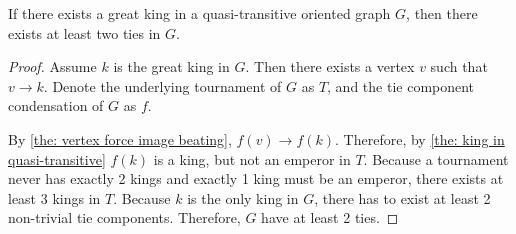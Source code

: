 \begin{corollary}
  If there exists a great king in a
  quasi-transitive oriented graph \(G\),
  then there exists at least two ties in \(G\).
\end{corollary}

\begin{proof}
  Assume \(k\) is the great king in \(G\).
  Then there exists a vertex  \(v\) such that \(v \to k\).
  Denote the underlying tournament of \(G\) as \(T\),
  and the tie component condensation of \(G\) as \(f\).

  By \cref{the: vertex force image beating}, \(f(v) \to f(k)\).
  Therefore, by \cref{the: king in quasi-transitive}
  \(f(k)\) is a king, but not an emperor in \(T\).
  Because a tournament never has exactly 2 kings
  and exactly 1 king must be an emperor,
  there exists at least 3 kings in \(T\).
  Because \(k\) is the only king in \(G\),
  there has to exist at least 2 non-trivial tie components.
  Therefore, \(G\) have at least 2 ties.
\end{proof}


